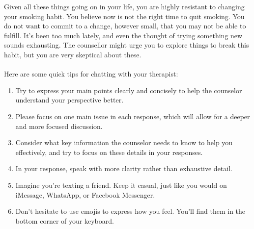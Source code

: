 \begin{tcolorbox}
	Given all these things going on in your life, you are highly resistant to changing your smoking habit. You believe now is not the right time to quit smoking. You do not want to commit to a change, however small, that you may not be able to fulfill. It's been too much lately, and even the thought of trying something new sounds exhausting. The counsellor might urge you to explore things to break this habit, but you are very skeptical about these.\\\\

	\vspace{5pt}
	Here are some quick tips for chatting with your therapist:
	\begin{enumerate}[itemsep=0pt, parsep=0pt]
		\item Try to express your main points clearly and concisely to help the counselor understand your perspective better.
		\item Please focus on one main issue in each response, which will allow for a deeper and more focused discussion.
		\item Consider what key information the counselor needs to know to help you effectively, and try to focus on these details in your responses.
		\item In your response, speak with more clarity rather than exhaustive detail.
		\item Imagine you're texting a friend. Keep it casual, just like you would on iMessage, WhatsApp, or Facebook Messenger.
		\item Don't hesitate to use emojis to express how you feel. You'll find them in the bottom corner of your keyboard.
	\end{enumerate}



\end{tcolorbox}
